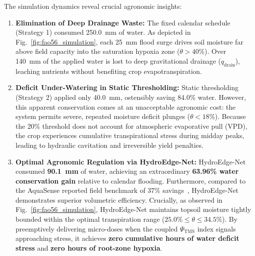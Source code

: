 The simulation dynamics reveal crucial agronomic insights:
\begin{enumerate}
    \item \textbf{Elimination of Deep Drainage Waste:} The fixed calendar schedule (Strategy 1) consumed 250.0~mm of water. As depicted in Fig.~\ref{fig:fao56_simulation}, each 25~mm flood surge drives soil moisture far above field capacity into the saturation hypoxia zone ($\theta > 40\%$). Over 140~mm of the applied water is lost to deep gravitational drainage ($q_{\text{drain}}$), leaching nutrients without benefiting crop evapotranspiration.
    \item \textbf{Deficit Under-Watering in Static Thresholding:} Static thresholding (Strategy 2) applied only 40.0~mm, ostensibly saving 84.0\% water. However, this apparent conservation comes at an unacceptable agronomic cost: the system permits severe, repeated moisture deficit plunges ($\theta < 18\%$). Because the 20\% threshold does not account for atmospheric evaporative pull (VPD), the crop experiences cumulative transpirational stress during midday peaks, leading to hydraulic cavitation and irreversible yield penalties.
    \item \textbf{Optimal Agronomic Regulation via HydroEdge-Net:} HydroEdge-Net consumed \textbf{90.1~mm} of water, achieving an extraordinary \textbf{63.96\% water conservation gain} relative to calendar flooding. Furthermore, compared to the AquaSense reported field benchmark of 37\% savings~\cite{zaman2026aquasense}, HydroEdge-Net demonstrates superior volumetric efficiency. Crucially, as observed in Fig.~\ref{fig:fao56_simulation}, HydroEdge-Net maintains topsoil moisture tightly bounded within the optimal transpiration range ($25.0\% \le \theta \le 34.5\%$). By preemptively delivering micro-doses when the coupled $\Psi_{\text{TMS}}$ index signals approaching stress, it achieves \textbf{zero cumulative hours of water deficit stress} and \textbf{zero hours of root-zone hypoxia}.
\end{enumerate}
